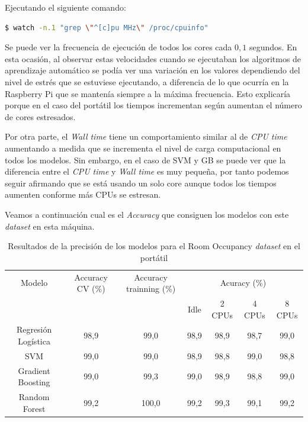 \documentclass[a4paper, 12pt]{book}
\begin{document}
Ejecutando el siguiente comando: 

\begin{lstlisting}[language=bash, showstringspaces=false]
  $ watch -n.1 "grep \"^[c]pu MHz\" /proc/cpuinfo"
\end{lstlisting}

Se puede ver la frecuencia de ejecución de todos los cores cada $0,1$ segundos. En esta ocasión, al observar estas velocidades cuando se ejecutaban los algoritmos de aprendizaje automático se podía ver una variación en los valores dependiendo del nivel de estrés que se estuviese ejecutando, a diferencia de lo que ocurría en la Raspberry Pi que se mantenía siempre a la máxima frecuencia. Esto explicaría porque en el caso del portátil los tiempos incrementan según aumentan el número de cores estresados. 

Por otra parte, el \textit{Wall time} tiene un comportamiento similar al de \textit{CPU time} aumentando a medida que se incrementa el nivel de carga computacional en todos los modelos. Sin embargo, en el caso de SVM y GB se puede ver que la diferencia entre el \textit{CPU time} y \textit{Wall time} es muy pequeña, por tanto podemos seguir afirmando que se está usando un solo core aunque todos los tiempos aumenten conforme más CPUs se estresan.

Veamos a continuación cual es el \textit{Accuracy} que consiguen los modelos con este \textit{dataset} en esta máquina.\\
\begin{table}[htb]
\renewcommand{\arraystretch}{1.5}
\begin{adjustbox}{width=\textwidth}
\centering
    \begin{tabular}{c  c  c  c  c  c  c}
    \hline
    Modelo & Accuracy CV (\%) & Accuracy trainning (\%) & \multicolumn{4}{c}{Acuracy (\%)} \\
    \cline{4-7}
      &  &   &  Idle & 2 CPUs & 4 CPUs & 8 CPUs \\
     \hline
     Regresión Logística & 98,9 & 99,0 & 98,9 & 98,9 & 98,7 & 99,0\\
     SVM & 99,0 & 99,0 & 98,9 & 98,8 & 99,0 & 98,8\\
     Gradient Boosting & 99,0 & 99,3 & 99,0 & 98,9 & 98,8 & 99,0\\
     Random Forest & 99,2 & 100,0 & 99,2 & 99,3 & 99,1 & 99,2\\
    \hline
    \end{tabular}
\end{adjustbox}
\caption{Resultados de la precisión de los modelos para el Room Occupancy \textit{dataset} en el portátil}
\label{tab:acc_Occpc}
\end{table}
\end{document}

